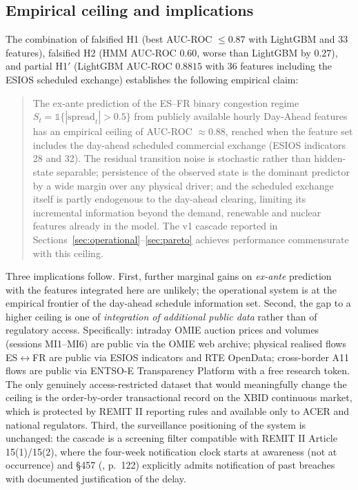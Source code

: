 \documentclass[11pt,a4paper]{article}
\begin{document}
\subsection{Empirical ceiling and implications}\label{sec:ceiling}

The combination of falsified H1 (best AUC-ROC $\leq 0.87$ with
LightGBM and 33 features), falsified H2 (HMM AUC-ROC $0.60$, worse
than LightGBM by $0.27$), and partial H1$'$ (LightGBM AUC-ROC
$0.8815$ with 36 features including the ESIOS scheduled exchange)
establishes the following empirical claim:

\begin{quote}
The ex-ante prediction of the ES--FR binary congestion regime
$S_t = \mathbb{1}\{|\mathrm{spread}_t| > 0.5\}$ from publicly
available hourly Day-Ahead features has an empirical ceiling
of AUC-ROC $\approx 0.88$, reached when the feature set includes
the day-ahead scheduled commercial exchange (ESIOS indicators 28
and 32). The residual transition noise is stochastic rather than
hidden-state separable; persistence of the observed state is the
dominant predictor by a wide margin over any physical driver; and
the scheduled exchange itself is partly endogenous to the
day-ahead clearing, limiting its incremental information beyond
the demand, renewable and nuclear features already in the model.
The v1 cascade reported in
Sections~\ref{sec:operational}--\ref{sec:pareto} achieves
performance commensurate with this ceiling.
\end{quote}

Three implications follow. First, further marginal gains on
\emph{ex-ante} prediction with the features integrated here are
unlikely; the operational system is at the empirical frontier of the
day-ahead schedule information set. Second, the gap to a higher
ceiling is one of \emph{integration of additional public data}
rather than of regulatory access. Specifically: intraday OMIE
auction prices and volumes (sessions MI1--MI6) are public via the
OMIE web archive; physical realised flows ES$\leftrightarrow$FR are
public via ESIOS indicators and RTE OpenData; cross-border A11
flows are public via ENTSO-E Transparency Platform with a free
research token. The only genuinely access-restricted dataset that
would meaningfully change the ceiling is the order-by-order
transactional record on the XBID continuous market, which is
protected by REMIT II reporting rules and available only to ACER
and national regulators. Third, the surveillance positioning of the
system is unchanged: the cascade is a screening filter compatible
with REMIT II Article 15(1)/15(2), where the four-week notification
clock starts at awareness (not at occurrence) and §457
(\citealp{ACER2024}, p.~122) explicitly admits notification of past
breaches with documented justification of the delay.
\end{document}
